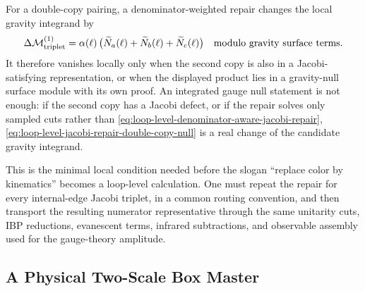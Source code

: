 \begin{controlledapproximation}
For a double-copy pairing, a denominator-weighted repair changes the local
gravity integrand by
\begin{equation}
  \Delta\mathcal M_{\rm triplet}^{(1)}
  =
  \alpha(\ell)\,
  \bigl(\widetilde N_a(\ell)
        +\widetilde N_b(\ell)
        +\widetilde N_c(\ell)\bigr)
  \quad
  \hbox{modulo gravity surface terms}.
  \label{eq:loop-level-jacobi-repair-double-copy-null}
\end{equation}
It therefore vanishes locally only when the second copy is also in a
Jacobi-satisfying representation, or when the displayed product lies in a
gravity-null surface module with its own proof.  An integrated gauge null
statement is not enough: if the second copy has a Jacobi defect, or if the
repair solves only sampled cuts rather than
\eqref{eq:loop-level-denominator-aware-jacobi-repair},
\eqref{eq:loop-level-jacobi-repair-double-copy-null} is a real change of the
candidate gravity integrand.

This is the minimal local condition needed before the slogan ``replace color by
kinematics'' becomes a loop-level calculation.  One must repeat the repair
for every internal-edge Jacobi triplet, in a common routing convention, and
then transport the resulting numerator representative through the same
unitarity cuts, IBP reductions, evanescent terms, infrared subtractions, and
observable assembly used for the gauge-theory amplitude.
\end{controlledapproximation}

\subsection{A Physical Two-Scale Box Master}
\label{subsec:physical-two-scale-box-master}

